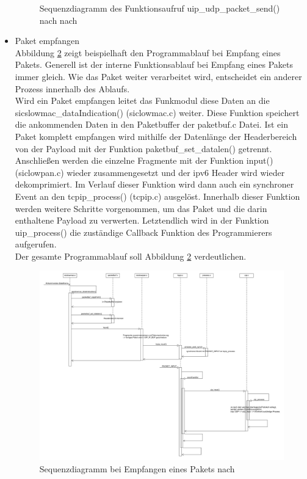 \begin{itemize}
\begin{figure}
			\caption{Sequenzdiagramm des Funktionsaufruf uip\_udp\_packet\_send() nach nach \cite{sendreceive}}
			\label{SendPacket}
		\end{figure}
		\item Paket empfangen\\
		Abbildung \ref{ReceivePacket} zeigt beispielhaft den Programmablauf bei Empfang eines Pakets. Generell ist der interne Funktionsablauf bei Empfang eines Pakets immer gleich. Wie das Paket weiter verarbeitet wird, entscheidet ein anderer Prozess innerhalb des Ablaufs.\\
		Wird ein Paket empfangen leitet das Funkmodul diese Daten an die sicslowmac\_dataIndication() (siclowmac.c) weiter. Diese Funktion speichert die ankommenden Daten in den Paketbuffer der paketbuf.c Datei. Ist ein Paket komplett empfangen wird mithilfe der Datenlänge der Headerbereich von der Payload mit der Funktion paketbuf\_set\_datalen() getrennt. Anschließen werden die einzelne Fragmente mit der Funktion input() (siclowpan.c) wieder zusammengesetzt und der \ac{ipv6} Header wird wieder dekomprimiert. Im Verlauf dieser Funktion wird dann auch ein synchroner Event an den tcpip\_process() (tcpip.c) ausgelöst. Innerhalb dieser Funktion werden weitere Schritte vorgenommen, um das Paket und die darin enthaltene Payload zu verwerten. Letztendlich wird in der Funktion uip\_process() die zuständige Callback Funktion des Programmierers aufgerufen.\\
		Der gesamte Programmablauf soll Abbildung \ref{ReceivePacket} verdeutlichen.
		\begin{figure}
			\centering
			\includegraphics[scale=0.28]{Grafiken-Julian/ReceivePacket.jpg}
			\caption{Sequenzdiagramm bei Empfangen eines Pakets nach \cite{sendreceive}}
			\label{ReceivePacket}
		\end{figure}
		
	\end{itemize}
	